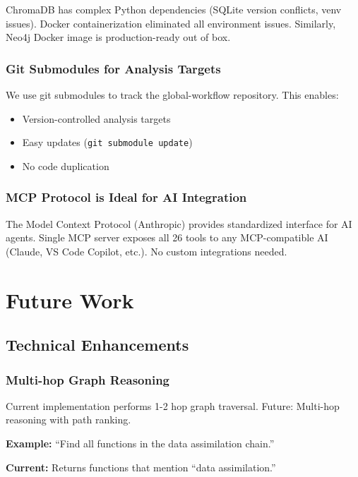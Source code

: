 \documentclass[11pt,letterpaper]{article}
\begin{document}
ChromaDB has complex Python dependencies (SQLite version conflicts, venv issues). Docker containerization eliminated all environment issues. Similarly, Neo4j Docker image is production-ready out of box.

\subsubsection{Git Submodules for Analysis Targets}

We use git submodules to track the global-workflow repository. This enables:
\begin{itemize}
    \item Version-controlled analysis targets
    \item Easy updates (\texttt{git submodule update})
    \item No code duplication
\end{itemize}

\subsubsection{MCP Protocol is Ideal for AI Integration}

The Model Context Protocol (Anthropic) provides standardized interface for AI agents. Single MCP server exposes all 26 tools to any MCP-compatible AI (Claude, VS Code Copilot, etc.). No custom integrations needed.

\section{Future Work}
\label{sec:future}

\subsection{Technical Enhancements}

\subsubsection{Multi-hop Graph Reasoning}

Current implementation performs 1-2 hop graph traversal. Future: Multi-hop reasoning with path ranking.

\textbf{Example:} ``Find all functions in the data assimilation chain.''

\textbf{Current:} Returns functions that mention ``data assimilation.''
\end{document}
